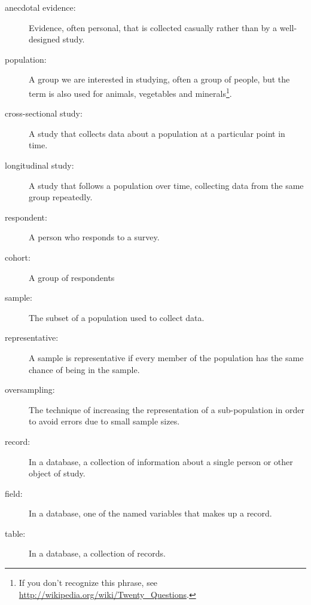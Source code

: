 \documentclass[12pt]{book}
\begin{document}
\begin{description}

\item[anecdotal evidence:] Evidence, often personal, that is collected
  casually rather than by a well-designed study.

\item[population:] A group we are interested in studying, often a
  group of people, but the term is also used for animals, vegetables
  and minerals\footnote{If you don't recognize this phrase, see
    \url{http://wikipedia.org/wiki/Twenty_Questions}.}.

\item[cross-sectional study:] A study that collects data about a
population at a particular point in time.

\item[longitudinal study:] A study that follows a population over
time, collecting data from the same group repeatedly.

\item[respondent:] A person who responds to a survey.

\item[cohort:] A group of respondents

\item[sample:] The subset of a population used to collect data.

\item[representative:] A sample is representative if every member
of the population has the same chance of being in the sample.

\item[oversampling:] The technique of increasing the representation
of a sub-population in order to avoid errors due to small sample
sizes.

\item[record:] In a database, a collection of information about
a single person or other object of study.

\item[field:] In a database, one of the named variables that makes
up a record.

\item[table:] In a database, a collection of records.


\end{description}
\end{document}
